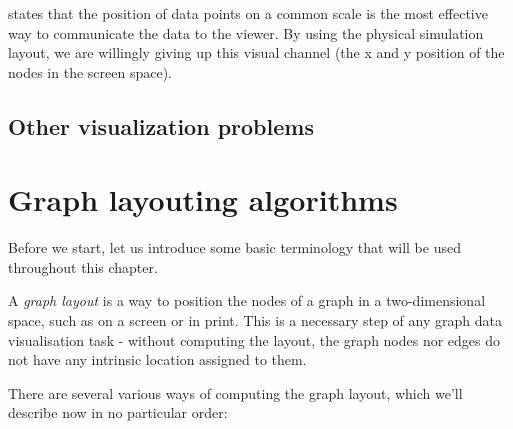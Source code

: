 \cite{munzner2015visualization} states that the position of data points on a common scale is the most effective way to communicate the data to the viewer.
By using the physical simulation layout, we are willingly giving up this visual channel (the x and y position of the nodes in the screen space).


\subsection{Other visualization problems}

\section{Graph layouting algorithms}

Before we start, let us introduce some basic terminology that will be used throughout this chapter.

A \emph{graph layout} is a way to position the nodes of a graph in a two-dimensional space, such as on a screen or in print. 
This is a necessary step of any graph data visualisation task - without computing the layout, the graph nodes nor edges do not have any intrinsic location assigned to them.

There are several various ways of computing the graph layout, which we'll describe now in no particular order:

